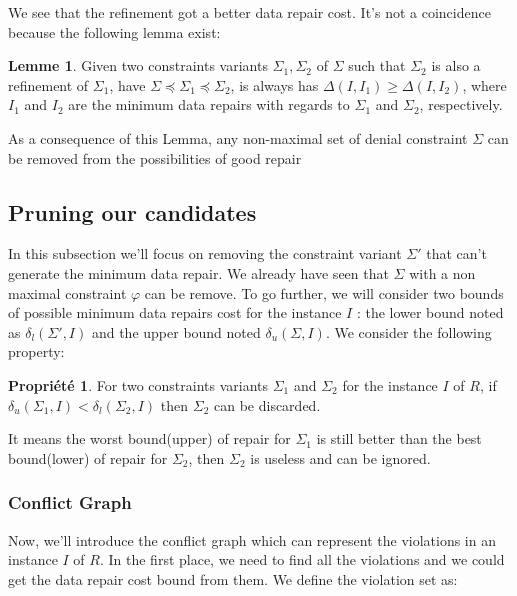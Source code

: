 \documentclass[letterpaper, 12pt]{report}
\theoremstyle{definition}
\newtheorem{myprop}{Propriété}
\newtheorem{mylemma}{Lemme}
\begin{document}
We see that the refinement got a better data repair cost. It's not a coincidence because the following lemma exist: \cite{main}

\begin{mylemma}
 Given two constraints variants $\Sigma_1,\Sigma_2$ of $\Sigma$ such that $\Sigma_2$
 is also a refinement of $\Sigma_1$, have $\Sigma \preceq \Sigma_1 \preceq \Sigma_2$, is always has $\Delta(I,I_1) \geq \Delta(I,I_2)$, where $I_1$ and $I_2$ are the minimum data repairs with regards to $\Sigma_1$ and $\Sigma_2$, respectively.
\end{mylemma}

As a consequence of this Lemma, any non-maximal set of denial constraint $\Sigma$ can be removed from the possibilities of good repair

\subsection{Pruning our candidates}

In this subsection we'll focus on removing the constraint variant $\Sigma '$ that can't generate the minimum data repair. We already have seen that $\Sigma$ with a non maximal constraint $\varphi$ can be remove. To go further, we will  consider two bounds of possible minimum data repairs cost for the instance $I$ : the lower bound noted as $\delta_l(\Sigma',I)$ and the upper bound noted $\delta_u(\Sigma,I)$. We consider the following property:

\begin{myprop}
\label{boundRemove}
	For two constraints variants $\Sigma_1$ and $\Sigma_2$ for the instance $I$ of $R$, if $\delta_u(\Sigma_1,I) < \delta_l(\Sigma_2,I)$ then $\Sigma_2$ can be discarded.
\end{myprop}

It means the worst bound(upper) of repair for $\Sigma_1$ is still better than the best bound(lower) of repair for $\Sigma_2$, then $\Sigma_2$ is useless and can be ignored.

\subsubsection{Conflict Graph}

Now, we'll introduce the conflict graph which can represent the violations in an instance $I$ of $R$. In the first place, we need to find all the violations and we could get the data repair cost bound from them. We define the violation set as: \cite{main}
\end{document}
